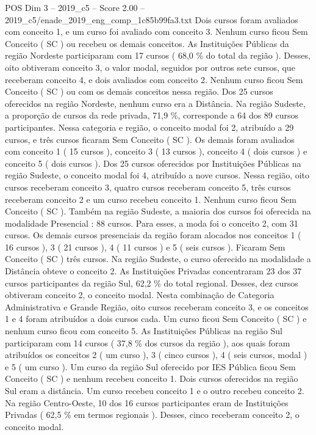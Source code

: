 \begin{textsample}{POS Dim 3 – 2019\_c5 – Score 2.00 – 2019\_c5/enade\_2019\_eng\_comp\_1c85b99fa3.txt}
Dois cursos foram avaliados com conceito 1, e um curso foi avaliado com conceito 3.
Nenhum curso ficou Sem Conceito ( SC ) ou recebeu os demais conceitos.
As Instituições Públicas da região Nordeste participaram com 17 cursos ( 68,0 \% do total da região ).
Desses, oito obtiveram conceito 3, o valor modal, seguidos por outros sete cursos, que receberam conceito 4, e dois avaliados com conceito 2.
Nenhum curso ficou Sem Conceito ( SC ) ou com os demais conceitos nessa região.
Dos 25 cursos oferecidos na região Nordeste, nenhum curso era a Distância.
Na região Sudeste, a proporção de cursos da rede privada, 71,9 \%, corresponde a 64 dos 89 cursos participantes.
Nessa categoria e região, o conceito modal foi 2, atribuído a 29 cursos, e três cursos ficaram Sem Conceito ( SC ).
Os demais foram avaliados com conceito 1 ( 15 cursos ), conceito 3 ( 13 cursos ), conceito 4 ( dois cursos ) e conceito 5 ( dois cursos ).
Dos 25 cursos oferecidos por Instituições Públicas na região Sudeste, o conceito modal foi 4, atribuído a nove cursos.
Nessa região, oito cursos receberam conceito 3, quatro cursos receberam conceito 5, três cursos receberam conceito 2 e um curso recebeu conceito 1.
Nenhum curso ficou Sem Conceito ( SC ).
Também na região Sudeste, a maioria dos cursos foi oferecida na modalidade Presencial : 88 cursos.
Para esses, a moda foi o conceito 2, com 31 cursos.
Os demais cursos presenciais da região foram alocados nos conceitos 1 ( 16 cursos ), 3 ( 21 cursos ), 4 ( 11 cursos ) e 5 ( seis cursos ).
Ficaram Sem Conceito ( SC ) três cursos.
Na região Sudeste, o curso oferecido na modalidade a Distância obteve o conceito 2.
As Instituições Privadas concentraram 23 dos 37 cursos participantes da região Sul, 62,2 \% do total regional.
Desses, dez cursos obtiveram conceito 2, o conceito modal.
Nesta combinação de Categoria Administrativa e Grande Região, oito cursos receberam conceito 3, e os conceitos 1 e 4 foram atribuídos a dois cursos cada.
Um curso ficou Sem Conceito ( SC ) e nenhum curso ficou com conceito 5.
As Instituições Públicas na região Sul participaram com 14 cursos ( 37,8 \% dos cursos da região ), aos quais foram atribuídos os conceitos 2 ( um curso ), 3 ( cinco cursos ), 4 ( seis cursos, modal ) e 5 ( um curso ).
Um curso da região Sul oferecido por IES Pública ficou Sem Conceito ( SC ) e nenhum recebeu conceito 1.
Dois cursos oferecidos na região Sul eram a distância.
Um curso recebeu conceito 1 e o outro recebeu conceito 2.
Na região Centro-Oeste, 10 dos 16 cursos participantes eram de Instituições Privadas ( 62,5 \% em termos regionais ).
Desses, cinco receberam conceito 2, o conceito modal.

\end{textsample}
